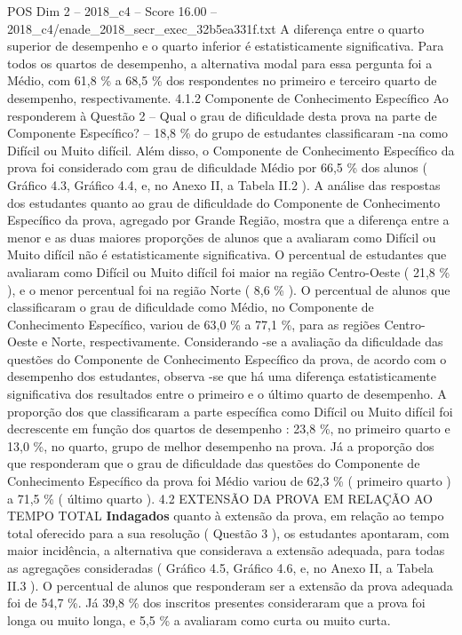 \begin{textsample}{POS Dim 2 – 2018\_c4 – Score 16.00 – 2018\_c4/enade\_2018\_secr\_exec\_32b5ea331f.txt}
A diferença entre o quarto superior de desempenho e o quarto inferior é estatisticamente significativa.
Para todos os quartos de desempenho, a alternativa modal para essa pergunta foi a Médio, com 61,8 \% a 68,5 \% dos respondentes no primeiro e terceiro quarto de desempenho, respectivamente. 4.1.2 Componente de Conhecimento Específico Ao responderem à Questão 2 – Qual o grau de dificuldade desta prova na parte de Componente Específico? – 18,8 \% do grupo de estudantes classificaram -na como Difícil ou Muito difícil.
Além disso, o Componente de Conhecimento Específico da prova foi considerado com grau de dificuldade Médio por 66,5 \% dos alunos ( Gráfico 4.3, Gráfico 4.4, e, no Anexo II, a Tabela II.2 ).
A análise das respostas dos estudantes quanto ao grau de dificuldade do Componente de Conhecimento Específico da prova, agregado por Grande Região, mostra que a diferença entre a menor e as duas maiores proporções de alunos que a avaliaram como Difícil ou Muito difícil não é estatisticamente significativa.
O percentual de estudantes que avaliaram como Difícil ou Muito difícil foi maior na região Centro-Oeste ( 21,8 \% ), e o menor percentual foi na região Norte ( 8,6 \% ).
O percentual de alunos que classificaram o grau de dificuldade como Médio, no Componente de Conhecimento Específico, variou de 63,0 \% a 77,1 \%, para as regiões Centro-Oeste e Norte, respectivamente.
Considerando -se a avaliação da dificuldade das questões do Componente de Conhecimento Específico da prova, de acordo com o desempenho dos estudantes, observa -se que há uma diferença estatisticamente significativa dos resultados entre o primeiro e o último quarto de desempenho.
A proporção dos que classificaram a parte específica como Difícil ou Muito difícil foi decrescente em função dos quartos de desempenho : 23,8 \%, no primeiro quarto e 13,0 \%, no quarto, grupo de melhor desempenho na prova.
Já a proporção dos que responderam que o grau de dificuldade das questões do Componente de Conhecimento Específico da prova foi Médio variou de 62,3 \% ( primeiro quarto ) a 71,5 \% ( último quarto ). 4.2 EXTENSÃO DA PROVA EM RELAÇÃO AO TEMPO TOTAL \textbf{Indagados} quanto à extensão da prova, em relação ao tempo total oferecido para a sua resolução ( Questão 3 ), os estudantes apontaram, com maior incidência, a alternativa que considerava a extensão adequada, para todas as agregações consideradas ( Gráfico 4.5, Gráfico 4.6, e, no Anexo II, a Tabela II.3 ).
O percentual de alunos que responderam ser a extensão da prova adequada foi de 54,7 \%.
Já 39,8 \% dos inscritos presentes consideraram que a prova foi longa ou muito longa, e 5,5 \% a avaliaram como curta ou muito curta.

\end{textsample}
